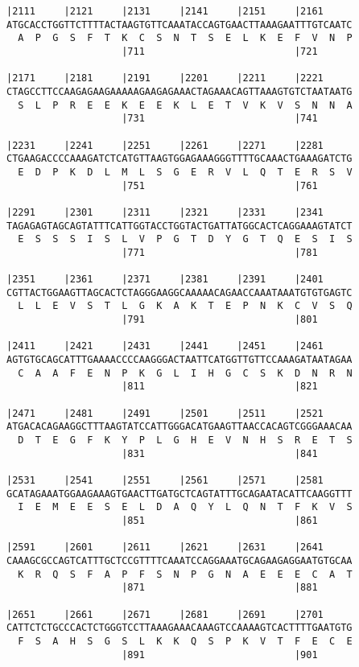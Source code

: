 \documentclass{article}
\begin{document}
\begin{Verbatim}
|2111     |2121     |2131     |2141     |2151     |2161     
ATGCACCTGGTTCTTTTACTAAGTGTTCAAATACCAGTGAACTTAAAGAATTTGTCAATC
  A  P  G  S  F  T  K  C  S  N  T  S  E  L  K  E  F  V  N  P
                    |711                          |721      
  
|2171     |2181     |2191     |2201     |2211     |2221     
CTAGCCTTCCAAGAGAAGAAAAAGAAGAGAAACTAGAAACAGTTAAAGTGTCTAATAATG
  S  L  P  R  E  E  K  E  E  K  L  E  T  V  K  V  S  N  N  A
                    |731                          |741      
  
|2231     |2241     |2251     |2261     |2271     |2281     
CTGAAGACCCCAAAGATCTCATGTTAAGTGGAGAAAGGGTTTTGCAAACTGAAAGATCTG
  E  D  P  K  D  L  M  L  S  G  E  R  V  L  Q  T  E  R  S  V
                    |751                          |761      
  
|2291     |2301     |2311     |2321     |2331     |2341     
TAGAGAGTAGCAGTATTTCATTGGTACCTGGTACTGATTATGGCACTCAGGAAAGTATCT
  E  S  S  S  I  S  L  V  P  G  T  D  Y  G  T  Q  E  S  I  S
                    |771                          |781      
  
|2351     |2361     |2371     |2381     |2391     |2401     
CGTTACTGGAAGTTAGCACTCTAGGGAAGGCAAAAACAGAACCAAATAAATGTGTGAGTC
  L  L  E  V  S  T  L  G  K  A  K  T  E  P  N  K  C  V  S  Q
                    |791                          |801      
  
|2411     |2421     |2431     |2441     |2451     |2461     
AGTGTGCAGCATTTGAAAACCCCAAGGGACTAATTCATGGTTGTTCCAAAGATAATAGAA
  C  A  A  F  E  N  P  K  G  L  I  H  G  C  S  K  D  N  R  N
                    |811                          |821      
  
|2471     |2481     |2491     |2501     |2511     |2521     
ATGACACAGAAGGCTTTAAGTATCCATTGGGACATGAAGTTAACCACAGTCGGGAAACAA
  D  T  E  G  F  K  Y  P  L  G  H  E  V  N  H  S  R  E  T  S
                    |831                          |841      
  
|2531     |2541     |2551     |2561     |2571     |2581     
GCATAGAAATGGAAGAAAGTGAACTTGATGCTCAGTATTTGCAGAATACATTCAAGGTTT
  I  E  M  E  E  S  E  L  D  A  Q  Y  L  Q  N  T  F  K  V  S
                    |851                          |861      
  
|2591     |2601     |2611     |2621     |2631     |2641     
CAAAGCGCCAGTCATTTGCTCCGTTTTCAAATCCAGGAAATGCAGAAGAGGAATGTGCAA
  K  R  Q  S  F  A  P  F  S  N  P  G  N  A  E  E  E  C  A  T
                    |871                          |881      
  
|2651     |2661     |2671     |2681     |2691     |2701     
CATTCTCTGCCCACTCTGGGTCCTTAAAGAAACAAAGTCCAAAAGTCACTTTTGAATGTG
  F  S  A  H  S  G  S  L  K  K  Q  S  P  K  V  T  F  E  C  E
                    |891                          |901      
  

\end{Verbatim}
\end{document}
